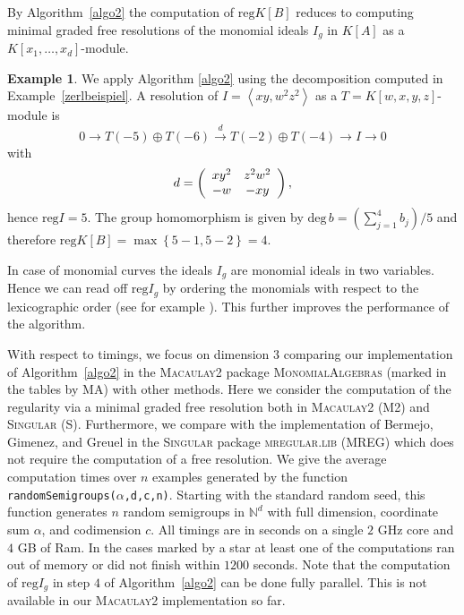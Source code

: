 \documentclass[11pt,a4paper]{amsart}%
\theoremstyle{definition}
\newtheorem{example}[theorem]{Example}
\theoremstyle{remark}
\numberwithin{equation}{section}
\theoremstyle{plain}
\begin{document}
By Algorithm~\ref{algo2} the computation of $\mathrm{reg}K[B]$ reduces to
computing minimal graded free resolutions of the monomial ideals $I_{g}$ in
$K[A]$ as a $K[x_{1},\ldots,x_{d}]$-module.

\begin{example}
We apply Algorithm \ref{algo2} using the decomposition computed in
Example~\ref{zerlbeispiel}. A resolution of $I=\left\langle xy,w^{2}%
z^{2}\right\rangle $ as a $T=K\left[  w,x,y,z\right]  $-module is%
\[
0\longrightarrow T\left(  -5\right)  \oplus T\left(  -6\right)  \overset
{d}{\longrightarrow}T\left(  -2\right)  \oplus T\left(  -4\right)
\longrightarrow I\longrightarrow0
\]
with%
\[
d=\left(
\begin{array}
[c]{cc}%
xy^{2} & z^{2}w^{2}\\
-w & -xy
\end{array}
\right) ,
\]
hence $\mathrm{reg}I=5$. The group homomorphism is given by $\mathrm{deg}%
\,b=(\sum_{j=1}^{4}b_{j})/5$ and therefore $\mathrm{reg}K[B]=\max\left\{
5-1,5-2\right\} =4$.
\end{example}

In case of monomial curves the ideals $I_{g}$ are monomial ideals in two
variables. Hence we can read off $\mathrm{reg}I_{g}$ by ordering the monomials
with respect to the lexicographic order (see for example
\cite[Proposition\,4.1]{MNEGMC}). This further improves the performance of the algorithm. 

With respect to timings, we focus on dimension $3$ comparing our
implementation of Algorithm~\ref{algo2} in the \textsc{Macaulay2} package \textsc{MonomialAlgebras} (marked in the tables by MA) with other methods. 
Here we consider the computation of the
regularity via a minimal graded free resolution both in \textsc{Macaulay2}
(M2) and \textsc{Singular} \cite{DGPS} (S). Furthermore, we compare with the
implementation of Bermejo, Gimenez, and Greuel in the \textsc{Singular}
package \textsc{mregular.lib} \cite{GLP2} (MREG) which does not require the
computation of a free resolution. We give the average computation times over
$n$ examples generated by the function \texttt{randomSemigroups($\alpha
$,d,c,n)}. Starting with the standard random seed, this function generates $n$
random semigroups in $\mathbb{N}^{d}$ with full dimension, coordinate sum
$\alpha$, and codimension $c$. All timings are in seconds on a single $2$ GHz
core and $4$ GB of Ram. In the cases marked by a star at least one of the
computations ran out of memory or did not finish within $1200$ seconds. Note
that the computation of $\mathrm{reg}I_{g}$ in step $4$ of
Algorithm~\ref{algo2} can be done fully parallel. This is not available in our
\textsc{Macaulay2} implementation so far.
\end{document}
